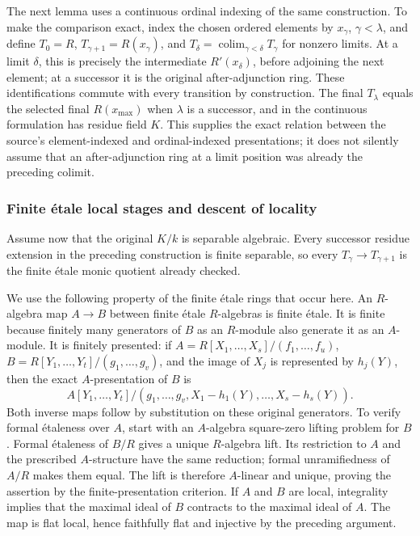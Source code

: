 The next lemma uses a continuous ordinal indexing of the same construction. To make the comparison exact, index the chosen ordered elements by \(x_\gamma\), \(\gamma<\lambda\), and define \(T_0=R\), \(T_{\gamma+1}=R(x_\gamma)\), and \(T_\delta=\operatorname*{colim}_{\gamma<\delta}T_\gamma\) for nonzero limits. At a limit \(\delta\), this is precisely the intermediate \(R'(x_\delta)\), before adjoining the next element; at a successor it is the original after-adjunction ring. These identifications commute with every transition by construction. The final \(T_\lambda\) equals the selected final \(R(x_{\max})\) when \(\lambda\) is a successor, and in the continuous formulation has residue field \(K\). This supplies the exact relation between the source's element-indexed and ordinal-indexed presentations; it does not silently assume that an after-adjunction ring at a limit position was already the preceding colimit.

\subsubsection{Finite étale local stages and descent of locality}\label{finite-uxe9tale-local-stages-and-descent-of-locality}

Assume now that the original \(K/k\) is separable algebraic. Every successor residue extension in the preceding construction is finite separable, so every \(T_\gamma\to T_{\gamma+1}\) is the finite étale monic quotient already checked.

We use the following property of the finite étale rings that occur here. An \(R\)-algebra map \(A\to B\) between finite étale \(R\)-algebras is finite étale. It is finite because finitely many generators of \(B\) as an \(R\)-module also generate it as an \(A\)-module. It is finitely presented: if \(A=R[X_1,\ldots,X_s]/(f_1,\ldots,f_u)\), \(B=R[Y_1,\ldots,Y_t]/(g_1,\ldots,g_v)\), and the image of \(X_j\) is represented by \(h_j(Y)\), then the exact \(A\)-presentation of \(B\) is \[
 A[Y_1,\ldots,Y_t]/(g_1,\ldots,g_v,X_1-h_1(Y),\ldots,X_s-h_s(Y)).
\] Both inverse maps follow by substitution on these original generators. To verify formal étaleness over \(A\), start with an \(A\)-algebra square-zero lifting problem for \(B\). Formal étaleness of \(B/R\) gives a unique \(R\)-algebra lift. Its restriction to \(A\) and the prescribed \(A\)-structure have the same reduction; formal unramifiedness of \(A/R\) makes them equal. The lift is therefore \(A\)-linear and unique, proving the assertion by the finite-presentation criterion. If \(A\) and \(B\) are local, integrality implies that the maximal ideal of \(B\) contracts to the maximal ideal of \(A\). The map is flat local, hence faithfully flat and injective by the preceding argument.

